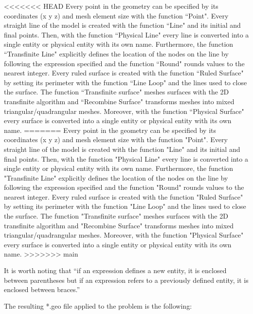 \documentclass[a4]{article}
\begin{document}
<<<<<<< HEAD
Every point in the geometry can be specified by its coordinates (x y z) and mesh element size with the function ``Point". Every straight line of the model is created with the function ``Line" and its initial and final points. Then, with the function ``Physical Line" every line is converted into a single entity or physical entity with its own name. Furthermore, the function ``Transfinite Line" explicitly defines the location of the nodes on the line by following the expression specified and the function ``Round" rounds values to the nearest integer. Every ruled surface is created with the function ``Ruled Surface" by setting its perimeter with the function ``Line Loop" and the lines used to close the surface. The function ``Transfinite surface" meshes surfaces with the 2D transfinite algorithm and ``Recombine Surface" transforms meshes into mixed triangular/quadrangular meshes. Moreover, with the function ``Physical Surface" every surface is converted into a single entity or physical entity with its own name.  
=======
Every point in the geometry can be specified by its coordinates (x y z) and mesh element size with the function "Point". Every straight line of the model is created with the function "Line" and its initial and final points. Then, with the function "Physical Line" every line is converted into a single entity or physical entity with its own name. Furthermore, the function "Transfinite Line" explicitly defines the location of the nodes on the line by following the expression specified and the function "Round" rounds values to the nearest integer. Every ruled surface is created with the function "Ruled Surface" by setting its perimeter with the function "Line Loop" and the lines used to close the surface. The function "Transfinite surface" meshes surfaces with the 2D transfinite algorithm and "Recombine Surface" transforms meshes into mixed triangular/quadrangular meshes. Moreover, with the function "Physical Surface" every surface is converted into a single entity or physical entity with its own name.  
>>>>>>> main

It is worth noting that “if an expression defines a new entity, it is enclosed between parentheses but if an expression refers to a previously defined entity, it is enclosed between braces.” \cite{gmshweb}

The resulting *.geo file applied to the problem is the following:
\end{document}
